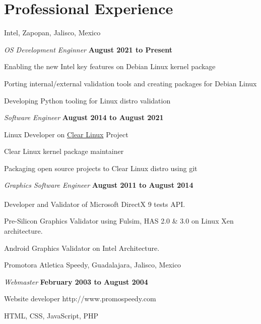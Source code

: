 \section{Professional Experience}
%
Intel, Zapopan, Jalisco, Mexico 
\begin{outerlist}
\item[] \textit{OS Development Enginner}%
    \hfill \textbf{August 2021 to Present}
    \begin{innerlist}
      \item Enabling the new Intel key features on Debian Linux kernel
        package
      \item Porting internal/external validation tools and creating packages
        for Debian Linux
      \item Developing Python tooling for Linux distro validation
    \end{innerlist}
\item[] \textit{Software Engineer}%
    \hfill \textbf{August 2014 to August 2021}
    \begin{innerlist}
      \item Linux Developer on 
	      \href{https://www.clearlinux.org/}{Clear Linux} Project
      \item Clear Linux kernel package maintainer
      \item Packaging open source projects to Clear Linux distro using git
    \end{innerlist}
\item[] \textit{Graphics Software Engineer}%
    \hfill \textbf{August 2011 to August 2014}
    \begin{innerlist}
        \item Developer and Validator of
           Microsoft\textsuperscript{\textregistered}
           DirectX\textsuperscript{\textregistered} 9 tests API.
        \item Pre-Silicon Graphics Validator using Fulsim, HAS 2.0 \& 3.0 on Linux Xen architecture.
	\item Android Graphics Validator on Intel Architecture.
    \end{innerlist}
\end{outerlist}

\blankline

Promotora Atletica Speedy, Guadalajara, Jalisco, Mexico
\begin{outerlist}
\item[] \textit{Webmaster}%
    \hfill \textbf{February 2003 to August 2004 }
    \begin{innerlist}
        \item Website developer http://www.promospeedy.com
        \item HTML, CSS, JavaScript, PHP
    \end{innerlist}
\end{outerlist}

